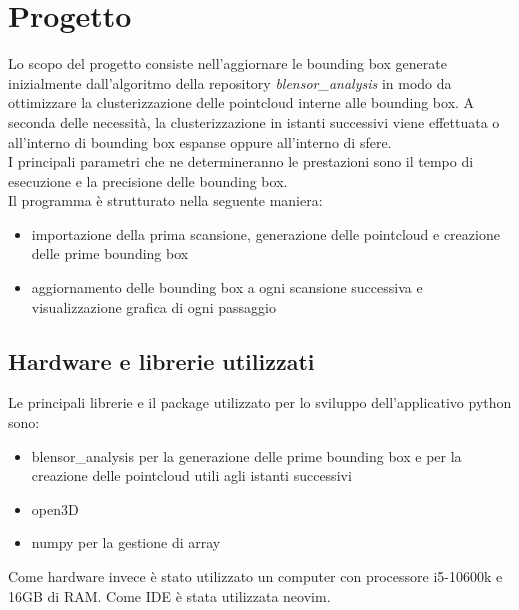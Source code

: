 \documentclass[italian]{report}
\begin{document}
\chapter{Progetto}
Lo scopo del progetto consiste nell'aggiornare le bounding box generate inizialmente dall'algoritmo della repository \textit{blensor\_analysis} in modo da ottimizzare la clusterizzazione delle pointcloud interne alle bounding box. A seconda delle necessità, la clusterizzazione in istanti successivi viene effettuata o all'interno di bounding box espanse oppure all'interno di sfere.\\
I principali parametri che ne determineranno le prestazioni sono il tempo di esecuzione e la precisione delle bounding box.\\ 
Il programma è strutturato nella seguente maniera:
\begin{itemize}
	\item importazione della prima scansione, generazione delle pointcloud e creazione delle prime bounding box
	\item aggiornamento delle bounding box a ogni scansione successiva e visualizzazione grafica di ogni passaggio
\end{itemize}
\section{Hardware e librerie utilizzati}
Le principali librerie e il package utilizzato per lo sviluppo dell'applicativo python sono:
\begin{itemize}
	\item blensor\_analysis per la generazione delle prime bounding box e per la creazione delle pointcloud utili agli istanti successivi
	\item open3D
	\item numpy per la gestione di array
\end{itemize}
Come hardware invece è stato utilizzato un computer con processore i5-10600k e 16GB di RAM. Come IDE è stata utilizzata neovim.
\end{document}
